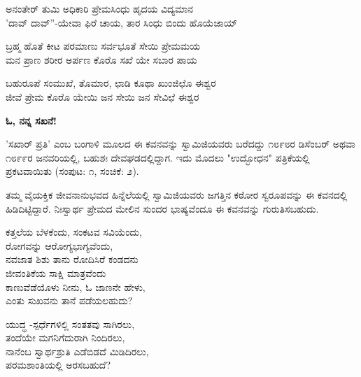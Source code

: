 
\begin{myquote}
ಅನಂತೇರ್ ತುಮಿ ಅಧಿಕಾರಿ ಪ್ರೇಮಸಿಂಧು ಹೃದಯ ವಿದ್ಯಮಾನ\\'ದಾವ್ ದಾವ್''-ಯೇವಾ ಫಿರೆ ಚಾಯ, ತಾರ ಸಿಂಧು ಬಿಂದು ಹೊಯೆಜಾಯ್
\end{myquote}


\begin{myquote}
ಬ್ರಹ್ಮ ಹೊತೆ ಕೀಟ ಪರಮಾಣು ಸರ್ವಭೂತೆ ಸೇಯಿ ಪ್ರೇಮಮಯ\\ಮನ ಪ್ರಾಣ ಶರೀರ ಅರ್ಪಣ ಕೊರೊ ಸಖೆ ಯೇ ಸಬಾರ ಪಾಯ
\end{myquote}


\begin{myquote}
ಬಹುರೂಪೆ ಸಂಮುಖೆ, ತೊಮಾರ, ಛಾಡಿ ಕೂಥಾ ಖುಂಜಿಛೊ ಈಶ್ವರ\\ಜೀವೆ ಪ್ರೇಮ ಕೊರೊ ಯೇಯಿ ಜನ ಸೇಯಿ ಜನ ಸೇವಿಛೆ ಈಶ್ವರ
\end{myquote}


\begin{center}
\textbf{ಓ, ನನ್ನ ಸಖನೆ!}
\end{center}

'ಸಖಾರ್ ಪ್ರತಿ' ಎಂಬ ಬಂಗಾಳಿ ಮೂಲದ ಈ ಕವನವನ್ನು ಸ್ವಾಮಿಜಿಯವರು ಬರೆದದ್ದು ೧೮೯೮ರ ಡಿಸೆಂಬರ್ ಅಥವಾ ೧೮೯೯ರ ಜನವರಿಯಲ್ಲಿ, ಬಹುಶಃ ದೇವಘಡದಲ್ಲಿದ್ದಾಗ. ಇದು ಮೊದಲು "ಉದ್ಭೋಧನ" ಪತ್ರಿಕೆಯಲ್ಲಿ ಪ್ರಕಟವಾಯಿತು (ಸಂಪುಟ: ೧, ಸಂಚಿಕೆ: ೨).

ತಮ್ಮ ವೈಯಕ್ತಿಕ ಜೀವನಾನುಭವದ ಹಿನ್ನೆಲೆಯಲ್ಲಿ ಸ್ವಾಮಿಜಿಯವರು ಜಗತ್ತಿನ ಕಠೋರ ಸ್ವರೂಪವನ್ನು ಈ ಕವನದಲ್ಲಿ ಹಿಡಿದಿಟ್ಟಿದ್ದಾರೆ. ನಿಃಸ್ವಾರ್ಥ ಪ್ರೇಮದ ಮೇಲಿನ ಸುಂದರ ಭಾಷ್ಯವೆಂದೂ ಈ ಕವನವನ್ನು ಗುರುತಿಸಬಹುದು.

\begin{myquote}
ಕತ್ತಲೆಯ ಬೆಳಕೆಂದು, ಸಂಕಟವ ಸವಿಯೆಂದು,\\ರೋಗವನ್ನು ಆರೋಗ್ಯಭಾಗ್ಯವೆಂದು,\\ನವಜಾತ ಶಿಶು ತಾನು ರೋದಿಸಿರೆ ಕಂಡದನು\\ಜೀವಂತಿಕೆಯ ಸಾಕ್ಷಿ ಮಾತ್ರವೆಂದು\\ಕಾಣುವೆಡೆಯೊಳು ನೀನು, ಓ ಜಾಣನೇ ಹೇಳು,\\ಎಂತು ಸುಖವನು ತಾನೆ ಪಡೆಯಲಹುದು?
\end{myquote}

\begin{myquote}
ಯುದ್ಧ -ಸ್ಪರ್ಧೆಗಳಿಲ್ಲಿ ಸಂತತವು ಸಾಗಿರಲು,\\ತಂದೆಯೇ ಮಗನಿಗೆದುರಾಗಿ ನಿಂದಿರಲು,\\ನಾನೆಂಬ ಸ್ವಾರ್ಥಶ್ರುತಿ ಎಡೆಬಿಡದೆ ಮಿಡಿದಿರಲು,\\ಪರಮಶಾಂತಿಯಲ್ಲಿ ಅರಸಬಹುದೆ? 
\end{myquote}

